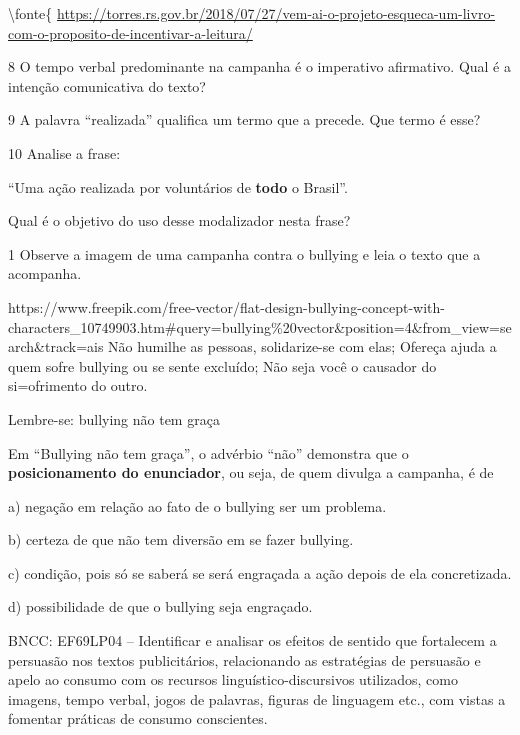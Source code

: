\textbackslash fonte\{
\url{https://torres.rs.gov.br/2018/07/27/vem-ai-o-projeto-esqueca-um-livro-com-o-proposito-de-incentivar-a-leitura/}

\num{8} O tempo verbal predominante na campanha é o imperativo
afirmativo. Qual é a intenção comunicativa do texto?



\num{9} A palavra ``realizada'' qualifica um termo que a precede. Que
termo é esse?



\num{10} Analise a frase:

``Uma ação realizada por voluntários de \textbf{{todo}} o Brasil''.

Qual é o objetivo do uso desse modalizador nesta frase?




\num{1} Observe a imagem de uma campanha contra o bullying e leia o
texto que a acompanha.

https://www.freepik.com/free-vector/flat-design-bullying-concept-with-characters\_10749903.htm\#query=bullying\%20vector\&position=4\&from\_view=search\&track=ais
Não humilhe as pessoas, solidarize-se com elas; Ofereça ajuda a quem
sofre bullying ou se sente excluído; Não seja você o causador do
si=ofrimento do outro.

Lembre-se: bullying não tem graça

Em ``Bullying não tem graça'', o advérbio ``não'' demonstra que o
\textbf{posicionamento do enunciador}, ou seja, de quem divulga a
campanha, é de

a) negação em relação ao fato de o bullying ser um problema.

b) certeza de que não tem diversão em se fazer bullying.

c) condição, pois só se saberá se será engraçada a ação depois de ela
concretizada.

d) possibilidade de que o bullying seja engraçado.

BNCC: EF69LP04 -- Identificar e analisar os efeitos de sentido que
fortalecem a persuasão nos textos publicitários, relacionando as
estratégias de persuasão e apelo ao consumo com os recursos
linguístico-discursivos utilizados, como imagens, tempo verbal, jogos de
palavras, figuras de linguagem etc., com vistas a fomentar práticas de
consumo conscientes.

